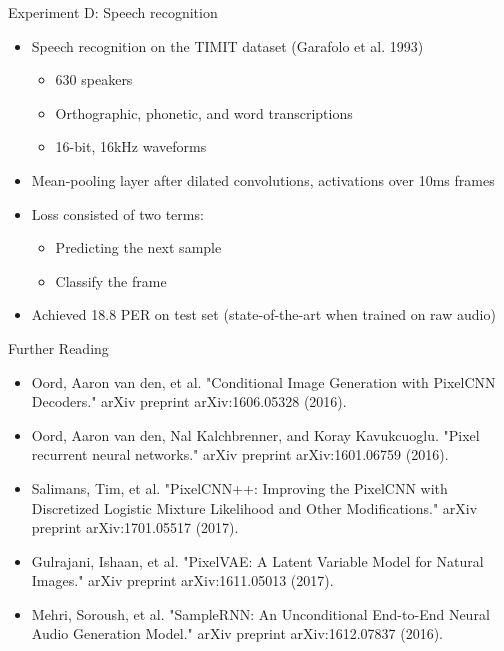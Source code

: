 \documentclass{beamer}
\begin{document}
  \begin{frame}{Experiment D: Speech recognition}

  \begin{itemize}
    \item Speech recognition on the TIMIT dataset (Garafolo et al. 1993)
      \begin{itemize}
        \item 630 speakers
        \item Orthographic, phonetic, and word transcriptions
        \item 16-bit, 16kHz waveforms
      \end{itemize}
    \item Mean-pooling layer after dilated convolutions, activations over 10ms frames
    \item Loss consisted of two terms:
      \begin{itemize}
        \item Predicting the next sample
        \item Classify the frame
      \end{itemize}

    \item Achieved 18.8 PER on test set (state-of-the-art when trained on raw audio)

  \end{itemize}

  \end{frame}

  \begin{frame}{Further Reading} 
    \begin{itemize}
      \item Oord, Aaron van den, et al. "Conditional Image Generation with PixelCNN Decoders." arXiv preprint arXiv:1606.05328 (2016).
      \item  Oord, Aaron van den, Nal Kalchbrenner, and Koray Kavukcuoglu. "Pixel recurrent neural networks." arXiv preprint arXiv:1601.06759 (2016).
        
      \item Salimans, Tim, et al. "PixelCNN++: Improving the PixelCNN with Discretized Logistic Mixture Likelihood and Other Modifications." arXiv preprint arXiv:1701.05517 (2017).
      \item Gulrajani, Ishaan, et al. "PixelVAE: A Latent Variable Model for Natural Images." arXiv preprint arXiv:1611.05013 (2017).
      \item Mehri, Soroush, et al. "SampleRNN: An Unconditional End-to-End Neural Audio Generation Model." arXiv preprint arXiv:1612.07837 (2016).
        
    \end{itemize}
  \end{frame}
\end{document}
